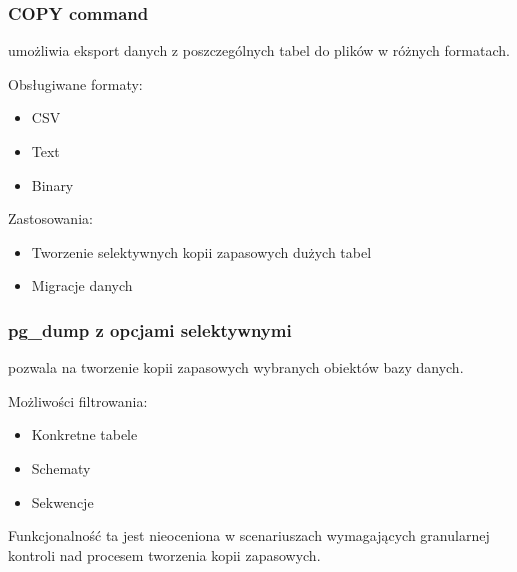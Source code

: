 \documentclass[letterpaper,10pt,polish]{sphinxmanual}
\begin{document}
\subsubsection{COPY command}
\label{\detokenize{rozdzial2/Kopie_zapasowe_i_odzyskiwanie_danych/kopie_zapasowe_i_odzyskiwanie_danych:copy-command}}
\sphinxAtStartPar
{} umożliwia eksport danych z poszczególnych tabel do plików w różnych formatach.

\sphinxAtStartPar
Obsługiwane formaty:
\begin{itemize}
\item {} 
\sphinxAtStartPar
CSV

\item {} 
\sphinxAtStartPar
Text

\item {} 
\sphinxAtStartPar
Binary

\end{itemize}

\sphinxAtStartPar
Zastosowania:
\begin{itemize}
\item {} 
\sphinxAtStartPar
Tworzenie selektywnych kopii zapasowych dużych tabel

\item {} 
\sphinxAtStartPar
Migracje danych

\end{itemize}


\subsubsection{pg\_dump z opcjami selektywnymi}
\label{\detokenize{rozdzial2/Kopie_zapasowe_i_odzyskiwanie_danych/kopie_zapasowe_i_odzyskiwanie_danych:pg-dump-z-opcjami-selektywnymi}}
\sphinxAtStartPar
{} pozwala na tworzenie kopii zapasowych wybranych obiektów bazy danych.

\sphinxAtStartPar
Możliwości filtrowania:
\begin{itemize}
\item {} 
\sphinxAtStartPar
Konkretne tabele

\item {} 
\sphinxAtStartPar
Schematy

\item {} 
\sphinxAtStartPar
Sekwencje

\end{itemize}

\sphinxAtStartPar
Funkcjonalność ta jest nieoceniona w scenariuszach wymagających granularnej kontroli nad procesem tworzenia kopii zapasowych.
\end{document}
